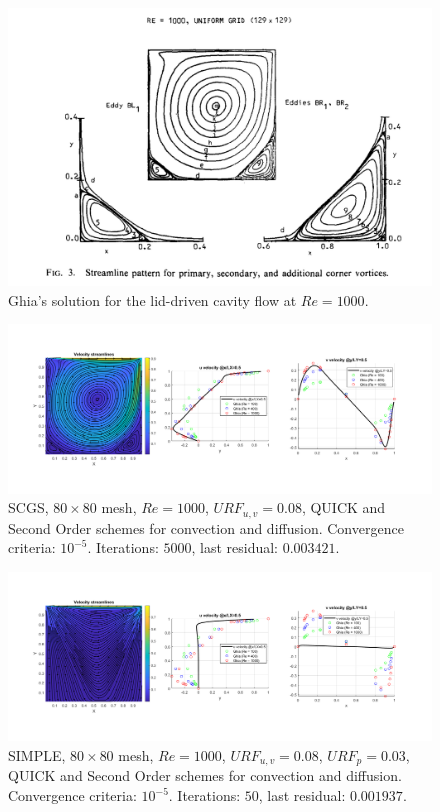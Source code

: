 \begin{figure}[H]
    \centering
    \includegraphics[width=.9\textwidth]{./img/ghia_solution_Re1000.png}
    \caption{Ghia's solution for the lid-driven cavity flow at $Re = 1000$.}
    \label{fig:ghia_solution}
\end{figure}

\begin{figure}[H]
    \centering
    \includegraphics[width=\textwidth]{img/New/SCGS_80x80_008_QUICK.png}
    \caption{SCGS, $80\times80$ mesh, $Re=1000$, $URF_{u,v}=0.08$, QUICK and Second Order schemes for convection and diffusion. Convergence criteria: $10^{-5}$. Iterations: $5000$, last residual: $0.003421$.}
    \label{fig:SCGS_80x80_008_QUICK}
\end{figure}

\begin{figure}[H]
    \centering
    \includegraphics[width=\textwidth]{img/New/50_SIMPLE_80x80_008_003_QUICK.png}
    \caption{SIMPLE, $80\times80$ mesh, $Re=1000$, $URF_{u,v}=0.08$, $URF_p=0.03$, QUICK and Second Order schemes for convection and diffusion. Convergence criteria: $10^{-5}$. Iterations: $50$, last residual: $0.001937$.}
    \label{fig:50_SIMPLE_80x80_008_003_QUICK}
\end{figure}

